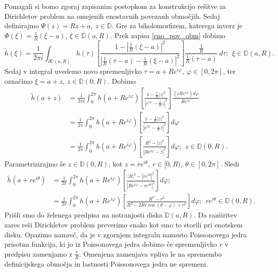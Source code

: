 \documentclass[mat1, tisk]{fmfdelo}
\begin{document}
     \begin{dokaz}
        Pomagali si bomo zgoraj zapisanim postopkom za konstrukcijo rešitve za \mbox{Dirichletov} problem na omejenih enostavnih povezanh območjih. 
        Sedaj definirajmo $\Psi(z) = Rz + a,~z \in \overline{\mathbb{D}}$. Gre za biholomorfizem, katerega inverz je \mbox{$\Phi(\xi) = \frac{1}{R}(\xi - a)$}, $\xi \in \overline{\mathbb{D}}(a,R)$.
        Prek zapisa \eqref{eno_pov_obm} dobimo
        $$ 
        \widetilde{h}(\xi) = \frac{1}{2\pi i}\int_{\partial \mathbb{D}(a,R)}{h(\tau) \left[\frac{1 - |\frac{1}{R}(\xi - a)|^2}{|\frac{1}{R}(\tau - a) - \frac{1}{R}(\xi - a)|^2}\right]\frac{\frac{1}{R}}{\frac{1}{R}(\tau - a)}~d \tau};~~\xi \in \mathbb{D}(a,R). 
        $$
        Sedaj v integral uvedemo novo spremenljivko $\tau = a + Re^{i \varphi},~\varphi \in [0,2\pi]$, ter označimo $\xi = a + z,~z \in \mathbb{D}(0, R)$. Dobimo
        \begin{align*}
            \widetilde{h}(a + z) &= \frac{1}{2\pi i}\int_{0}^{2 \pi}{h(a + R e^{i \varphi}) \left[\frac{1 - \frac{1}{R}|z|^2}{|e^{i \varphi} - \frac{1}{R} z|^2}\right]\frac{(i R e^{i \varphi}) d \varphi}{R e^{i \varphi}}}\\
            & = \frac{1}{2 \pi}\int_{0}^{2 \pi}{h(a + R e^{i \varphi}) \left[\frac{1 - \frac{1}{R}|z|^2}{|e^{i \varphi} - \frac{1}{R} z|^2}\right]d\varphi}\\
            & = \frac{1}{2 \pi}\int_{0}^{2 \pi}{h(a + R e^{i \varphi}) \left[\frac{R^2 - |z|^2}{|R e^{i \varphi} - z|^2}\right]d\varphi};~~z \in \mathbb{D}(0,R).
        \end{align*}
        Parametrizirajmo še $z \in \mathbb{D}(0,R)$, kot $z = r e^{i \theta},~r \in [0,R),~\theta \in [0,2 \pi]$. Sledi
        \begin{align*}
            \widetilde{h}(a + r e^{i \theta}) &= \frac{1}{2 \pi}\int_{0}^{2 \pi}{h(a + R e^{i \varphi}) \left[\frac{|R|^2 - |r e^{i \theta}|^2}{|R e^{i \varphi} - r e^{i \theta}|^2}\right]d\varphi}; \\
            & = \frac{1}{2 \pi}\int_{0}^{2 \pi}{h(a + R e^{i \varphi}) \left[\frac{R^2 - r^2}{R^2 - 2Rr \cos(\theta - \varphi) + r^2}\right]d\varphi};~~r e^{i \theta} \in \mathbb{D}(0,R).
        \end{align*}
        Prišli smo do želenega predpisa na notranjosti diska $\mathbb{D}(a,R)$. Da razširitev zares reši Dirichletov problem preverimo enako kot smo to storili pri enotskem disku. 
        Opazimo namreč, da je v zgornjem integralu namesto Poissonovega jedra prisotna funkcija, ki jo iz Poissonovega jedra dobimo če spremenljivko $r$ v predpisu zamenjamo z $\frac{r}{R}$. 
        Omenjena zamenjava vpliva le na spremembo definicijskega območja in lastnosti Poissonovega jedra ne spremeni.
     \end{dokaz}
\end{document}
